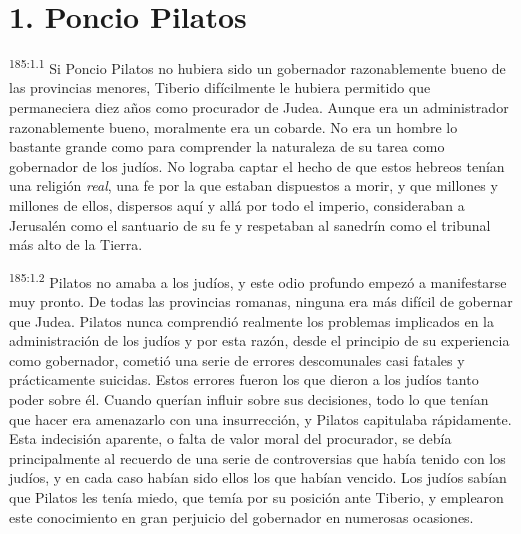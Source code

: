 \section*{1. Poncio Pilatos}
\par 
\textsuperscript{185:1.1} Si Poncio Pilatos no hubiera sido un gobernador razonablemente bueno de las provincias menores, Tiberio difícilmente le hubiera permitido que permaneciera diez años como procurador de Judea. Aunque era un administrador razonablemente bueno, moralmente era un cobarde. No era un hombre lo bastante grande como para comprender la naturaleza de su tarea como gobernador de los judíos. No lograba captar el hecho de que estos hebreos tenían una religión \textit{real}, una fe por la que estaban dispuestos a morir, y que millones y millones de ellos, dispersos aquí y allá por todo el imperio, consideraban a Jerusalén como el santuario de su fe y respetaban al sanedrín como el tribunal más alto de la Tierra.

\par 
\textsuperscript{185:1.2} Pilatos no amaba a los judíos, y este odio profundo empezó a manifestarse muy pronto. De todas las provincias romanas, ninguna era más difícil de gobernar que Judea. Pilatos nunca comprendió realmente los problemas implicados en la administración de los judíos y por esta razón, desde el principio de su experiencia como gobernador, cometió una serie de errores descomunales casi fatales y prácticamente suicidas. Estos errores fueron los que dieron a los judíos tanto poder sobre él. Cuando querían influir sobre sus decisiones, todo lo que tenían que hacer era amenazarlo con una insurrección, y Pilatos capitulaba rápidamente. Esta indecisión aparente, o falta de valor moral del procurador, se debía principalmente al recuerdo de una serie de controversias que había tenido con los judíos, y en cada caso habían sido ellos los que habían vencido. Los judíos sabían que Pilatos les tenía miedo, que temía por su posición ante Tiberio, y emplearon este conocimiento en gran perjuicio del gobernador en numerosas ocasiones.

